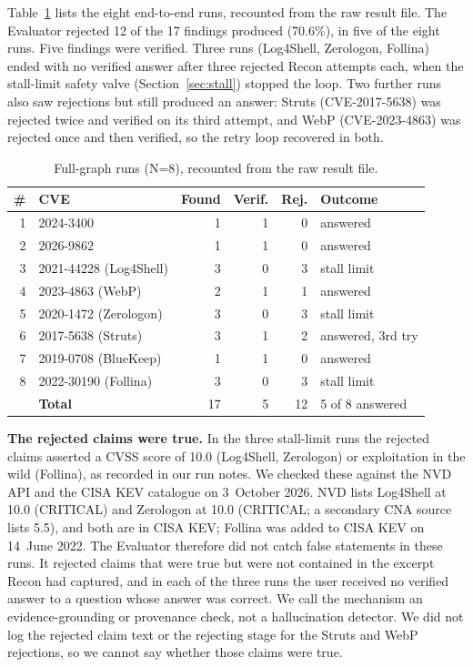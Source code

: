 \documentclass[conference]{IEEEtran}
\begin{document}
Table~\ref{tab:fullgraph} lists the eight end-to-end runs, recounted from
the raw result file. The Evaluator rejected 12 of the 17 findings produced
(70.6\%), in five of the eight runs. Five findings were verified. Three
runs (Log4Shell, Zerologon, Follina) ended with no verified answer after
three rejected Recon attempts each, when the stall-limit safety valve
(Section~\ref{sec:stall}) stopped the loop. Two further runs also saw
rejections but still produced an answer: Struts (CVE-2017-5638) was
rejected twice and verified on its third attempt, and WebP (CVE-2023-4863)
was rejected once and then verified, so the retry loop recovered in both.

\begin{table}[t]
\caption{Full-graph runs (N=8), recounted from the raw result file.}
\label{tab:fullgraph}
\centering
\footnotesize
\setlength{\tabcolsep}{3pt}
\begin{tabular}{@{}rp{3.1cm}rrrp{1.5cm}@{}}
\toprule
\textbf{\#} & \textbf{CVE} & \textbf{Found} & \textbf{Verif.} & \textbf{Rej.} & \textbf{Outcome} \\
\midrule
1 & 2024-3400 & 1 & 1 & 0 & answered \\
2 & 2026-9862 & 1 & 1 & 0 & answered \\
3 & 2021-44228 (Log4Shell) & 3 & 0 & 3 & stall limit \\
4 & 2023-4863 (WebP) & 2 & 1 & 1 & answered \\
5 & 2020-1472 (Zerologon) & 3 & 0 & 3 & stall limit \\
6 & 2017-5638 (Struts) & 3 & 1 & 2 & answered, 3rd try \\
7 & 2019-0708 (BlueKeep) & 1 & 1 & 0 & answered \\
8 & 2022-30190 (Follina) & 3 & 0 & 3 & stall limit \\
\midrule
 & \textbf{Total} & 17 & 5 & 12 & 5 of 8 answered \\
\bottomrule
\end{tabular}
\end{table}

\textbf{The rejected claims were true.} In the three stall-limit runs the
rejected claims asserted a CVSS score of 10.0 (Log4Shell, Zerologon) or
exploitation in the wild (Follina), as recorded in our run notes. We checked
these against the NVD API and the CISA KEV catalogue on 3~October 2026. NVD
lists Log4Shell at 10.0 (CRITICAL) and Zerologon at 10.0 (CRITICAL; a
secondary CNA source lists 5.5), and both are in CISA KEV; Follina was added
to CISA KEV on 14~June 2022. The Evaluator therefore did not catch false
statements in these runs. It rejected claims that were true but were not
contained in the excerpt Recon had captured, and in each of the three
runs the user received no verified answer to a question whose answer was
correct. We call the mechanism an evidence-grounding or provenance check,
not a hallucination detector. We did not log the rejected claim text or the
rejecting stage for the Struts and WebP rejections, so we cannot say whether
those claims were true.
\end{document}
